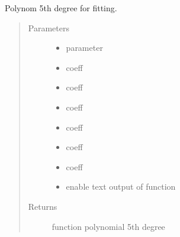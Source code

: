 \documentclass[letterpaper,10pt,english]{sphinxmanual}
\begin{document}
\begin{fulllineitems}
\begin{sphinxVerbatim}[commandchars=\\\{\}]
 
\end{sphinxVerbatim}

\end{fulllineitems}


\begin{fulllineitems}
\label{\detokenize{fit-functions:fit_functions.poly5}}
Polynom 5th degree for fitting.
\begin{quote}\begin{description}
\item[{Parameters}] \leavevmode\begin{itemize}
\item {} 
 \textendash{} parameter

\item {} 
 \textendash{} coeff

\item {} 
 \textendash{} coeff

\item {} 
 \textendash{} coeff

\item {} 
 \textendash{} coeff

\item {} 
 \textendash{} coeff

\item {} 
 \textendash{} coeff

\item {} 
 \textendash{} enable text output of function

\end{itemize}

\item[{Returns}] \leavevmode
function \textendash{} polynomial 5th degree

\end{description}\end{quote}

\end{fulllineitems}
\end{document}
